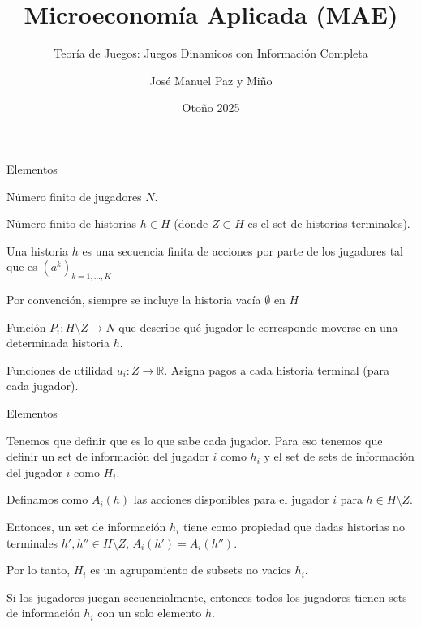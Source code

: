 \documentclass[notes, 11pt]{beamer} %
\newenvironment{wideitemize}{\itemize\addtolength{\itemsep}{10pt}}{\enditemize}
\begin{document}
\title{Microeconom\'ia Aplicada (MAE)}   
\subtitle{Teor\'ia de Juegos: Juegos Dinamicos con Informaci\'on Completa}   
\author[Paz y Mino ]{Jos\'e Manuel Paz y Mi\~no}
\date{Oto\~no 2025} 

\frame{\titlepage} 

\begin{frame}{Elementos}
		\begin{wideitemize}
			\item<1-> N\'umero finito de jugadores $N$.
			\item<2-> N\'umero finito de historias $h \in H$ (donde $Z \subset H$ es el set de historias terminales). 
			\begin{wideitemize}
				\item<3->[--] Una historia $h$ es una secuencia finita de acciones por parte de los jugadores tal que es $(a^{k})_{k=1,\dots,K}$ 
				\item<4->[--] Por convenci\'on, siempre se incluye la historia vac\'ia $\emptyset$ en $H$
			\end{wideitemize}
			\item<5-> Funci\'on $P_{i} : H\setminus Z \rightarrow N$ que describe qu\'e jugador le corresponde moverse en una determinada historia $h$.
			\item<6-> Funciones de utilidad $u_{i}: Z \rightarrow \mathbb{R}$. Asigna pagos a cada historia terminal (para cada jugador).
		\end{wideitemize}
\end{frame}

\begin{frame}{Elementos}
 		\begin{wideitemize}
 			\item<1-> Tenemos que definir que es lo que sabe cada jugador. Para eso tenemos que definir un set de informaci\'on del jugador $i$ como $h_{i}$ y el set de sets de informaci\'on del jugador $i$ como $H_{i}$.

 			\item<2-> Definamos como $A_{i}(h)$ las acciones disponibles para el jugador $i$ para $h \in H \setminus Z$.

 			\item<3-> Entonces, un set de informaci\'on $h_{i}$ tiene como propiedad que dadas historias no terminales $h',h'' \in H \setminus Z$, $A_{i}(h') = A_{i}(h'')$.

 			\item<4-> Por lo tanto, $H_{i}$ es un agrupamiento de subsets no vacios $h_{i}$.

 			\item<5-> Si los jugadores juegan secuencialmente, entonces todos los jugadores tienen sets de informaci\'on $h_{i}$ con un solo elemento $h$.
 		\end{wideitemize}
\end{frame}
\end{document}
